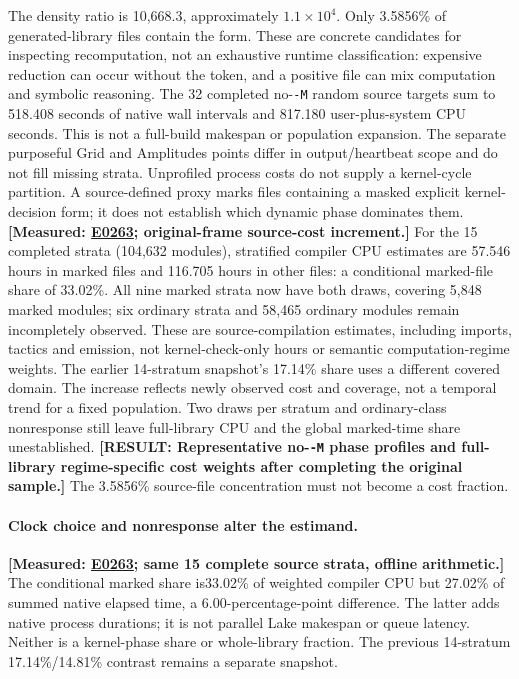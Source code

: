 \documentclass[10pt,twocolumn]{article}
\newcommand{\missing}[1]{\textbf{[RESULT: #1]}}
\newcommand{\measured}[1]{\textbf{[Measured: #1]}}
\newcommand{\expref}[2]{\href{https://github.com/yunwei37/proofserve/blob/main/docs/tmp/build-and-evaluate/step-#1/step-report.md}{E#2}}
\begin{document}
The density ratio is 10,668.3, approximately $1.1\times10^4$.
Only 3.5856\% of generated-library files contain the form.
These are concrete candidates for inspecting recomputation, not an exhaustive
runtime classification: expensive reduction can occur without the token,
and a positive file can mix computation and symbolic reasoning.
The 32 completed no-\texttt{-M} random source targets sum to 518.408 seconds
of native wall intervals and 817.180 user-plus-system CPU seconds.
This is not a full-build makespan or population expansion.
The separate purposeful Grid and Amplitudes points differ in output/heartbeat
scope and do not fill missing strata.
Unprofiled process costs do not supply a kernel-cycle partition.
A source-defined proxy marks files containing a masked explicit kernel-decision
form; it does not establish which dynamic phase dominates them.
\measured{\expref{0263-20261102T040256+0000}{0263}; original-frame source-cost increment.}
For the 15 completed strata (104,632 modules), stratified compiler CPU estimates
are 57.546 hours in marked files and 116.705 hours in other files:
a conditional marked-file share of 33.02\%.
All nine marked strata now have both draws, covering 5,848 marked modules;
six ordinary strata and 58,465 ordinary modules remain incompletely observed.
These are source-compilation estimates, including imports, tactics and emission,
not kernel-check-only hours or semantic computation-regime weights.
The earlier 14-stratum snapshot's 17.14\% share uses a different covered domain.
The increase reflects newly observed cost and coverage, not a temporal trend
for a fixed population. Two draws per stratum and ordinary-class nonresponse
still leave full-library CPU and the global marked-time share unestablished.
\missing{Representative no-\texttt{-M} phase profiles and full-library
regime-specific cost weights after completing the original sample.}
The 3.5856\% source-file concentration must not become a cost fraction.

\paragraph{Clock choice and nonresponse alter the estimand.}
\measured{\expref{0263-20261102T040256+0000}{0263}; same 15 complete source strata, offline arithmetic.}
The conditional marked share is33.02\% of weighted compiler CPU but 27.02\%
of summed native elapsed time, a 6.00-percentage-point difference.
The latter adds native process durations; it is not parallel Lake makespan
or queue latency. Neither is a kernel-phase share or whole-library fraction.
The previous 14-stratum 17.14\%/14.81\% contrast remains a separate snapshot.
\end{document}

